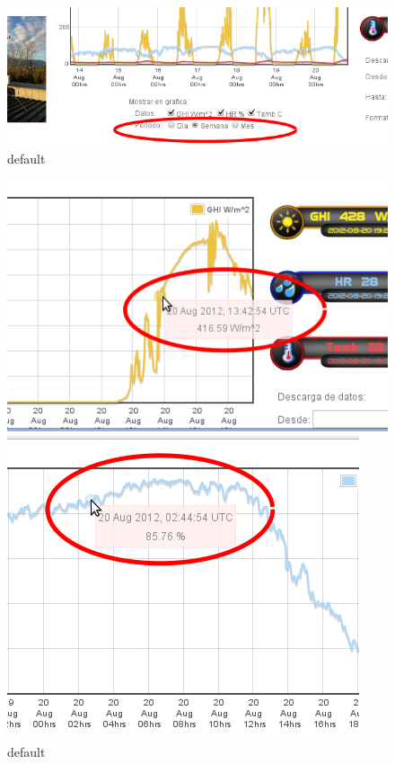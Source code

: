 \begin{figure}[ht]
        \centering
        \includegraphics[width=\textwidth]{./images/cap5chap1img3}
        \caption{default}
        \label{fig:figure1}
\end{figure}
\begin{figure}[ht]
	\begin{minipage}[b]{0.45\linewidth}
        	\centering
        	\includegraphics[width=\textwidth]{./images/cap5chap1img4-1}
        	\caption{default}
        	\label{fig:figure1}
	\end{minipage}
	\begin{minipage}[b]{0.45\linewidth}
                \centering
                \includegraphics[width=\textwidth]{./images/cap5chap1img4-2}

\end{minipage}
\end{figure}
